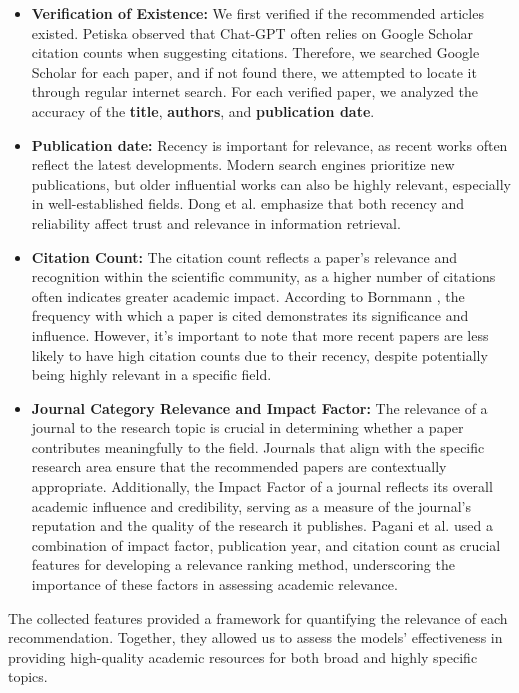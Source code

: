 \documentclass[runningheads]{llncs}
\begin{document}
\begin{itemize}
    \item \textbf{Verification of Existence:} We first verified if the recommended articles existed. Petiska \cite{petiska_2023} observed that Chat-GPT often relies on Google Scholar citation counts when suggesting citations. Therefore, we searched Google Scholar for each paper, and if not found there, we attempted to locate it through regular internet search. For each verified paper, we analyzed the accuracy of the \textbf{title}, \textbf{authors}, and \textbf{publication date}.
    \item \textbf{Publication date:} Recency is important for relevance, as recent works often reflect the latest developments. Modern search engines prioritize new publications, but older influential works can also be highly relevant, especially in well-established fields. Dong et al. \cite{dong2010towards} emphasize that both recency and reliability affect trust and relevance in information retrieval.
    \item \textbf{Citation Count:} The citation count reflects a paper's relevance and recognition within the scientific community, as a higher number of citations often indicates greater academic impact. According to Bornmann \cite{bornmann2017measuring}, the frequency with which a paper is cited demonstrates its significance and influence. However, it's important to note that more recent papers are less likely to have high citation counts due to their recency, despite potentially being highly relevant in a specific field.
    \item \textbf{Journal Category Relevance and Impact Factor:} The relevance of a journal to the research topic is crucial in determining whether a paper contributes meaningfully to the field. Journals that align with the specific research area ensure that the recommended papers are contextually appropriate. Additionally, the Impact Factor of a journal reflects its overall academic influence and credibility, serving as a measure of the journal's reputation and the quality of the research it publishes. Pagani et al. \cite{pagani2015methodi} used a combination of impact factor, publication year, and citation count as crucial features for developing a relevance ranking method, underscoring the importance of these factors in assessing academic relevance.
\end{itemize}

The collected features provided a framework for quantifying the relevance of each recommendation. Together, they allowed us to assess the models’ effectiveness in providing high-quality academic resources for both broad and highly specific topics.
\end{document}
